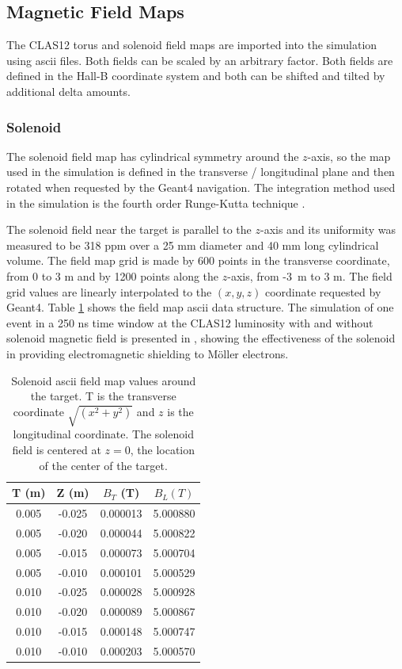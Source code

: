 \subsection{Magnetic Field Maps} \label{clas12FieldMaps}

The CLAS12 torus and solenoid field maps are imported into the simulation using ascii files. Both fields can be scaled by an arbitrary factor.
Both fields are defined in the Hall-B coordinate system and both can be shifted and tilted by additional delta amounts.

\subsubsection{Solenoid}
The solenoid field map has cylindrical symmetry around the $z$-axis, so the map used in the simulation is defined
in the transverse / longitudinal plane and then rotated when requested by the Geant4 navigation.
The integration method used in the simulation is the fourth order Runge-Kutta technique \cite{rungeKutta}.

The solenoid field near the target is parallel to the $z$-axis and its uniformity was measured to be 318 ppm over a 25 mm
diameter and 40 mm long cylindrical volume. The field map grid is made by 600 points in the transverse coordinate,
from 0 to 3 m and by 1200 points along the $z$-axis, from \mbox{-3 m} to 3 m.
The field grid values are linearly interpolated to the $(x,y,z)$ coordinate requested by Geant4.
Table \ref{tab:solMap} shows the field map ascii data structure. The simulation of one event in a 250 ns time window at
the CLAS12 luminosity with and without solenoid magnetic field is presented in , showing the effectiveness
of the solenoid in providing electromagnetic shielding to M\"oller electrons.

\begin{table}[h]
	\begin{center}
		\begin{tabular}{| c | c | c | c |}
			T (m)  & Z (m) &  $B_T$ (T) & $ B_L (T)$ \\
			\hline
          0.005  &  -0.025 & 0.000013  & 5.000880 \\
          0.005  &  -0.020 & 0.000044  & 5.000822 \\
          0.005  &  -0.015 & 0.000073  & 5.000704 \\
          0.005  &  -0.010 & 0.000101  & 5.000529 \\
          0.010  &  -0.025 & 0.000028  & 5.000928 \\
          0.010  &  -0.020 & 0.000089  & 5.000867 \\
          0.010  &  -0.015 & 0.000148  & 5.000747 \\
          0.010  &  -0.010 & 0.000203  & 5.000570 \\
		\end{tabular}
	\end{center}
\caption{Solenoid ascii field map values around the target. T is the transverse coordinate $\sqrt{(x^2+y^2)}$ and $z$ is the longitudinal coordinate.
		 The solenoid field is centered at $z=0$, the location of the center of the target.}\label{tab:solMap}
\end{table}

